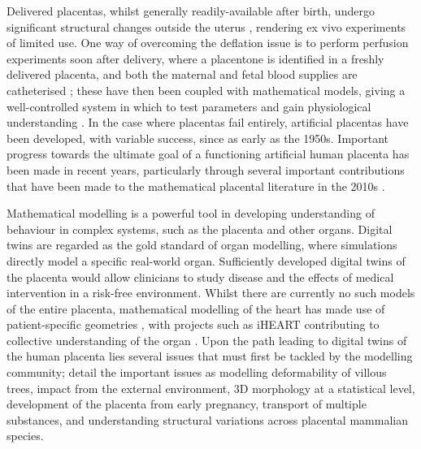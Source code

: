         Delivered placentas, whilst generally readily-available after birth, undergo significant structural changes outside the uterus \cite{lecarpentierComputationalFluidDynamic2016}, rendering ex vivo experiments of limited use. One way of overcoming the deflation issue is to perform perfusion experiments soon after delivery, where a placentone is identified in a freshly delivered placenta, and both the maternal and fetal blood supplies are catheterised \cite{schneiderModifiedDoublecircuitVitro1984,lewisPlacentalPerfusionMathematical2020}; these have then been coupled with mathematical models, giving a well-controlled system in which to test parameters and gain physiological understanding \cite{lewisPlacentalPerfusionMathematical2020}. In the case where placentas fail entirely, artificial placentas have been developed, with variable success, since as early as the 1950s. Important progress towards the ultimate goal of a functioning artificial human placenta has been made in recent years, particularly through several important contributions that have been made to the mathematical placental literature in the 2010s \cite{tunDifferencesPlacentalCapillary2019,saghianAssociationPlacentalJets2017,katoVillousTreeModel2017,serovOptimalVilliDensity2015,serovRoleMorphologyMathematical2016,lecarpentierComputationalFluidDynamic2016,clarkMultiscaleModellingFeto2015,chernyavskyTransportPlacentaHomogenizing2011,chernyavskyMathematicalModelIntervillous2010,burtonRheologicalPhysiologicalConsequences2009,lewisPlacentalPerfusionMathematical2020}.
        
        Mathematical modelling is a powerful tool in developing understanding of behaviour in complex systems, such as the placenta and other organs. Digital twins are regarded as the gold standard of organ modelling, where simulations directly model a specific real-world organ. Sufficiently developed digital twins of the placenta would allow clinicians to study disease and the effects of medical intervention in a risk-free environment. Whilst there are currently no such models of the entire placenta, mathematical modelling of the heart has made use of patient-specific geometries \cite{taoDigitalTwinModeling2022}, with projects such as iHEART contributing to collective understanding of the organ \cite{zingaroComprehensiveMathematicalModel2023}. Upon the path leading to digital twins of the human placenta lies several issues that must first be tackled by the modelling community; \citeauthor{jensenBloodFlowTransport2019} \cite{jensenBloodFlowTransport2019} detail the important issues as modelling deformability of villous trees, impact from the external environment, 3D morphology at a statistical level, development of the placenta from early pregnancy, transport of multiple substances, and understanding structural variations across placental mammalian species.
        
